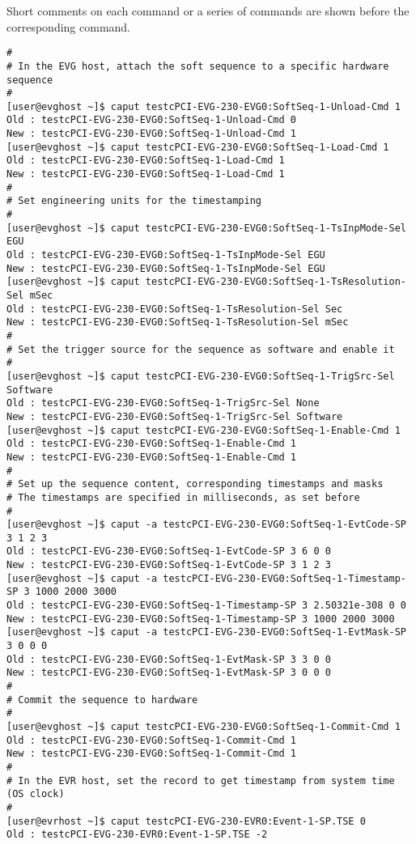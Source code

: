 \documentclass[11pt
  , a4paper
  , article
  , oneside
  , showtrims
]{memoir}
\begin{document}
Short comments on each command or a series of commands are shown before the corresponding command.
\begin{lstlisting}[style=termstyle]
#
# In the EVG host, attach the soft sequence to a specific hardware sequence
#
[user@evghost ~]$ caput testcPCI-EVG-230-EVG0:SoftSeq-1-Unload-Cmd 1
Old : testcPCI-EVG-230-EVG0:SoftSeq-1-Unload-Cmd 0
New : testcPCI-EVG-230-EVG0:SoftSeq-1-Unload-Cmd 1
[user@evghost ~]$ caput testcPCI-EVG-230-EVG0:SoftSeq-1-Load-Cmd 1
Old : testcPCI-EVG-230-EVG0:SoftSeq-1-Load-Cmd 1
New : testcPCI-EVG-230-EVG0:SoftSeq-1-Load-Cmd 1
#
# Set engineering units for the timestamping
#
[user@evghost ~]$ caput testcPCI-EVG-230-EVG0:SoftSeq-1-TsInpMode-Sel EGU
Old : testcPCI-EVG-230-EVG0:SoftSeq-1-TsInpMode-Sel EGU
New : testcPCI-EVG-230-EVG0:SoftSeq-1-TsInpMode-Sel EGU
[user@evghost ~]$ caput testcPCI-EVG-230-EVG0:SoftSeq-1-TsResolution-Sel mSec
Old : testcPCI-EVG-230-EVG0:SoftSeq-1-TsResolution-Sel Sec
New : testcPCI-EVG-230-EVG0:SoftSeq-1-TsResolution-Sel mSec
#
# Set the trigger source for the sequence as software and enable it
#
[user@evghost ~]$ caput testcPCI-EVG-230-EVG0:SoftSeq-1-TrigSrc-Sel Software
Old : testcPCI-EVG-230-EVG0:SoftSeq-1-TrigSrc-Sel None
New : testcPCI-EVG-230-EVG0:SoftSeq-1-TrigSrc-Sel Software
[user@evghost ~]$ caput testcPCI-EVG-230-EVG0:SoftSeq-1-Enable-Cmd 1
Old : testcPCI-EVG-230-EVG0:SoftSeq-1-Enable-Cmd 1
New : testcPCI-EVG-230-EVG0:SoftSeq-1-Enable-Cmd 1
#
# Set up the sequence content, corresponding timestamps and masks
# The timestamps are specified in milliseconds, as set before
#
[user@evghost ~]$ caput -a testcPCI-EVG-230-EVG0:SoftSeq-1-EvtCode-SP 3 1 2 3
Old : testcPCI-EVG-230-EVG0:SoftSeq-1-EvtCode-SP 3 6 0 0
New : testcPCI-EVG-230-EVG0:SoftSeq-1-EvtCode-SP 3 1 2 3
[user@evghost ~]$ caput -a testcPCI-EVG-230-EVG0:SoftSeq-1-Timestamp-SP 3 1000 2000 3000
Old : testcPCI-EVG-230-EVG0:SoftSeq-1-Timestamp-SP 3 2.50321e-308 0 0
New : testcPCI-EVG-230-EVG0:SoftSeq-1-Timestamp-SP 3 1000 2000 3000
[user@evghost ~]$ caput -a testcPCI-EVG-230-EVG0:SoftSeq-1-EvtMask-SP 3 0 0 0
Old : testcPCI-EVG-230-EVG0:SoftSeq-1-EvtMask-SP 3 3 0 0
New : testcPCI-EVG-230-EVG0:SoftSeq-1-EvtMask-SP 3 0 0 0
#
# Commit the sequence to hardware
#
[user@evghost ~]$ caput testcPCI-EVG-230-EVG0:SoftSeq-1-Commit-Cmd 1
Old : testcPCI-EVG-230-EVG0:SoftSeq-1-Commit-Cmd 1
New : testcPCI-EVG-230-EVG0:SoftSeq-1-Commit-Cmd 1
#
# In the EVR host, set the record to get timestamp from system time (OS clock)
#
[user@evrhost ~]$ caput testcPCI-EVG-230-EVR0:Event-1-SP.TSE 0
Old : testcPCI-EVG-230-EVR0:Event-1-SP.TSE -2

\end{lstlisting}
\end{document}
